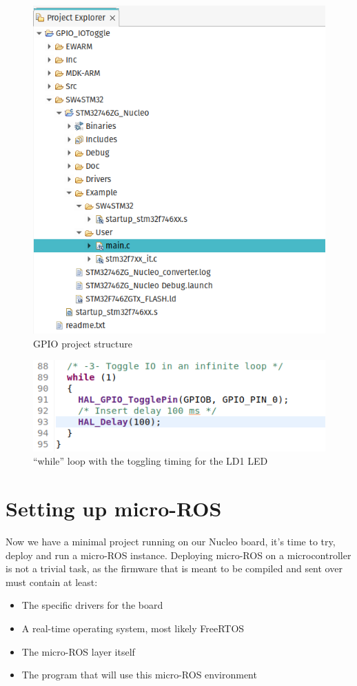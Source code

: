 \documentclass[10pt]{article}
\begin{document}
\begin{figure}[h]
  \centering
  \includegraphics[width=.9\textwidth]{./img/tree.png}
  \caption{GPIO project structure}
  \label{fig:tree}
\end{figure}

\begin{figure}[!h]
  \centering
  \includegraphics[width=.9\textwidth]{./img/toggle_led.png}
  \caption{``while'' loop with the toggling timing for the LD1 LED}
  \label{fig:toggle_led}
\end{figure}

\pagebreak
\section{Setting up micro-ROS}
\label{sec:micro-ros}
Now we have a minimal project running on our Nucleo board, it's time to try, deploy and run a micro-ROS instance.
Deploying micro-ROS on a microcontroller is not a trivial task, as the firmware that is meant to be compiled and sent over must contain at least:
\begin{itemize}
\item The specific drivers for the board
\item A real-time operating system, most likely FreeRTOS
\item The micro-ROS layer itself
\item The program that will use this micro-ROS environment
\end{itemize}
\end{document}
